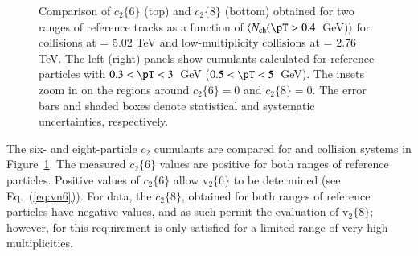 \documentclass[cernpreprint,texlive=2014,txfonts,UKenglish]{latex/atlasdoc}
\renewcommand{\eqref}[1]{\textup{{\normalfont(\ref{#1}}\normalfont)}}
\begin{document}
\begin{figure}[ht!]
\begin{center}
\caption{Comparison of $c_2\{6\}$ (top) and  $c_2\{8\}$ (bottom) obtained for two \pT ranges of reference tracks as a function of $\langle N_{\mathrm{ch}}(\pT > 0.4$~GeV)$\rangle$  for \pPb collisions at \sqn= 5.02 TeV and low-multiplicity \PbPb collisions at \sqn= 2.76 TeV. The left (right) panels show cumulants calculated for reference particles with $0.3 < \pT <3$~GeV ($0.5 < \pT <5$~GeV). The insets zoom in on the regions around $c_2\{6\}= 0$ and $c_2\{8\}= 0$. The error bars and shaded boxes denote statistical and systematic uncertainties, respectively.}
\label{fig:c268} 
\end{center}
\end{figure} 

The six- and eight-particle $c_2$ cumulants are compared for \pPb and \PbPb collision systems in Figure~\ref{fig:c268}.  The measured $c_2\{6\}$ values are positive for both \pT ranges of reference particles. Positive values of $c_2\{6\}$ allow $\mathrm{v}_2\{6\}$ to be determined (see Eq.~\eqref{eq:vn6}).   For  \PbPb data, the $c_2\{8\}$, obtained for both \pT ranges of reference particles have negative values, and as such permit the evaluation of  $\mathrm{v}_2\{8\}$; however, for \pPb this requirement is only satisfied for a limited range of very high multiplicities. 
\end{document}
